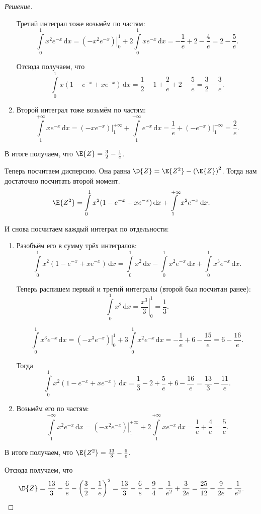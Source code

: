 \begin{proof}[Решение]
\begin{enumerate}
		Третий интеграл тоже возьмём по частям:
		\[\int\limits_{0}^{1} x^{2}e^{-x}\,\mathrm{d}x = \left.\left(-x^{2}e^{-x}\right)\right|_{0}^{1} + 2\int\limits_{0}^{1} xe^{-x}\,\mathrm{d}x = -\frac{1}{e} + 2 - \frac{4}{e} = 2 - \frac{5}{e}.\]
		
		Отсюда получаем, что
		\[\int\limits_{0}^{1} x(1 - e^{-x} + xe^{-x})\,\mathrm{d}x = \frac{1}{2} - 1 + \frac{2}{e} + 2 - \frac{5}{e} = \frac{3}{2} - \frac{3}{e}.\]
		
		\item Второй интеграл тоже возьмём по частям:
		\[
		\int\limits_{1}^{+\infty} xe^{-x}\,\mathrm{d}x = \left.\left(-xe^{-x}\right)\right|_{1}^{+\infty} + \int\limits_{1}^{+\infty} e^{-x}\,\mathrm{d}x = \frac{1}{e} + \left.\left(-e^{-x}\right)\right|_{1}^{+\infty} = \frac{2}{e}.
		\]
	\end{enumerate}

	В итоге получаем, что \(\E{Z} = \frac{3}{2} - \frac{1}{e}\).
	
	Теперь посчитаем дисперсию. Она равна \(\D{Z} = \E{Z^2} - \left(\E{Z}\right)^2\). Тогда нам достаточно посчитать второй момент.
	\[\E{Z^2} = \int\limits_{0}^{1} x^{2}(1 - e^{-x} + xe^{-x})\,\mathrm{d}x + \int\limits_{1}^{+\infty}x^{2}e^{-x}\,\mathrm{d}x.\]
	
	И снова посчитаем каждый интеграл по отдельности:
	\begin{enumerate}
		\item Разобъём его в сумму трёх интегралов:
		\[\int\limits_{0}^{1} x^{2}(1 - e^{-x} + xe^{-x})\,\mathrm{d}x = \int\limits_{0}^{1} x^{2}\,\mathrm{d}x - \int\limits_{0}^{1} x^{2}e^{-x}\,\mathrm{d}x + \int\limits_{0}^{1} x^{3}e^{-x}\,\mathrm{d}x.\]
		
		Теперь распишем первый и третий интегралы (второй был посчитан ранее):
		\[
		\int\limits_{0}^{1} x^{2}\,\mathrm{d}x = \left.\frac{x^{3}}{3}\right|_{0}^{1} = \frac{1}{3}.
		\]
		
		\[
		\int\limits_{0}^{1} x^{3}e^{-x}\,\mathrm{d}x = \left.\left(-x^{3}e^{-x}\right)\right|_{0}^{1} + 3\int\limits_{0}^{1} x^{2}e^{-x}\,\mathrm{d}x = -\frac{1}{e} + 6 - \frac{15}{e} = 6 - \frac{16}{e}.
		\]
		
		Тогда
		\[\int\limits_{0}^{1} x^{2}(1 - e^{-x} + xe^{-x})\,\mathrm{d}x = \frac{1}{3} - 2 + \frac{5}{e} + 6 - \frac{16}{e} = \frac{13}{3} - \frac{11}{e}.\]
		
		\item Возьмём его по частям:
		\[
		\int\limits_{1}^{+\infty} x^{2}e^{-x}\,\mathrm{d}x = \left.\left(-x^{2}e^{-x}\right)\right|_{1}^{+\infty} + 2\int\limits_{1}^{+\infty} xe^{-x}\,\mathrm{d}x = \frac{1}{e} + \frac{4}{e} = \frac{5}{e}.
		\]
	\end{enumerate}

	В итоге получаем, что \(\E{Z^2} = \frac{13}{3} - \frac{6}{e}\).
	
	Отсюда получаем, что
	\[
	\D{Z} = \frac{13}{3} - \frac{6}{e} - \left(\frac{3}{2} - \frac{1}{e}\right)^2 = \frac{13}{3} - \frac{6}{e} - \frac{9}{4} - \frac{1}{e^2} + \frac{3}{2e} = \frac{25}{12} - \frac{9}{2e} - \frac{1}{e^2}.\qedhere
	\]
\end{proof}

